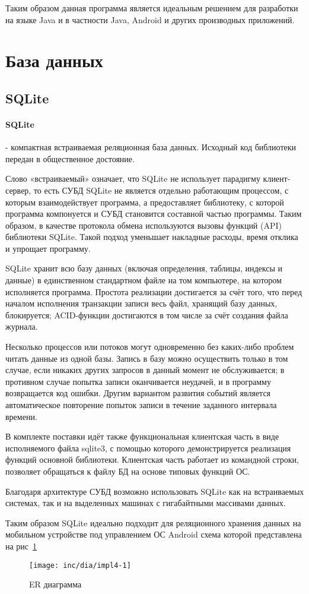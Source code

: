 Таким образом данная программа является идеальным решением для разработки на языке Java и в частности Java, Android и других производных приложений.

\section{База данных}
\subsection{SQLite}
\paragraph{SQLite} - компактная встраиваемая реляционная база данных. Исходный код библиотеки передан в общественное достояние.

Слово «встраиваемый» означает, что SQLite не использует парадигму клиент-сервер, то есть СУБД SQLite не является отдельно работающим процессом, с которым взаимодействует программа, а предоставляет библиотеку, с которой программа компонуется и СУБД становится составной частью программы. Таким образом, в качестве протокола обмена используются вызовы функций (API) библиотеки SQLite. Такой подход уменьшает накладные расходы, время отклика и упрощает программу.

SQLite хранит всю базу данных (включая определения, таблицы, индексы и данные) в единственном стандартном файле на том компьютере, на котором исполняется программа. Простота реализации достигается за счёт того, что перед началом исполнения транзакции записи весь файл, хранящий базу данных, блокируется; ACID-функции достигаются в том числе за счёт создания файла журнала.

Несколько процессов или потоков могут одновременно без каких-либо проблем читать данные из одной базы. Запись в базу можно осуществить только в том случае, если никаких других запросов в данный момент не обслуживается; в противном случае попытка записи оканчивается неудачей, и в программу возвращается код ошибки. Другим вариантом развития событий является автоматическое повторение попыток записи в течение заданного интервала времени.

В комплекте поставки идёт также функциональная клиентская часть в виде исполняемого файла sqlite3, с помощью которого демонстрируется реализация функций основной библиотеки. Клиентская часть работает из командной строки, позволяет обращаться к файлу БД на основе типовых функций ОС.

Благодаря архитектуре СУБД возможно использовать SQLite как на встраиваемых системах, так и на выделенных машинах с гигабайтными массивами данных.

Таким образом SQLite идеально подходит для реляционного хранения данных на мобильном устройстве под управлением ОС Android схема которой представлена на рис~\ref{fig:fig25}
\begin{figure}[ht!]
  \centering
  \texttt{[image: inc/dia/impl4-1]}
  \caption{ER диаграмма}
  \label{fig:fig25}
\end{figure}



